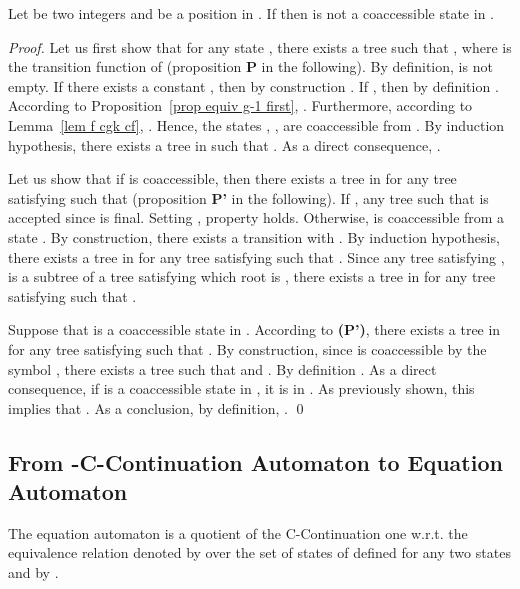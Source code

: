 \documentclass{llncs}
\begin{document}
 
 \begin{lemma}\label{lem}
Let  be two integers and  be a position in .
 If  then  is not a coaccessible state in .
 \end{lemma}
\begin{proof}
Let us first show that for any state , there exists a tree  such that , where  is the transition function of  (proposition \textbf{P} in the following). By definition,  is not empty. If there exists a constant , then by construction . 
If , then by definition . According to Proposition~\ref{prop equiv g-1 first}, . Furthermore, according to Lemma~\ref{lem f cgk cf}, . Hence, the states , ,  are coaccessible from . By induction hypothesis, there exists a tree  in  such that . As a direct consequence, .

Let us show that if  is coaccessible, then there exists a tree  in  for any tree  satisfying  such that  (proposition \textbf{P'} in the following). 
  If , any tree  such that  is accepted since  is final. Setting , property holds. 
  Otherwise,  is coaccessible from a state . By construction, there exists a transition  with . By induction hypothesis, there exists a tree  in  for any tree  satisfying  such that . Since any tree  satisfying , is a subtree of a tree  satisfying  which root is , there exists a tree  in  for any tree  satisfying  such that .

Suppose that  is a coaccessible state in . According to \textbf{(P')}, there exists a tree  in  for any tree  satisfying  such that . By construction, since  is coaccessible by the symbol , there exists a tree  such that  and . By definition .
As a direct consequence, if  is a coaccessible state in , it is in . As previously shown, this implies that . As a conclusion, by definition, .
  \qed
  
\end{proof}




\subsection{From -C-Continuation Automaton to Equation Automaton}

The equation automaton is a quotient of the C-Continuation one
w.r.t. the equivalence relation denoted by  over the set of states of  defined for any two states  and  by .
\end{document}
